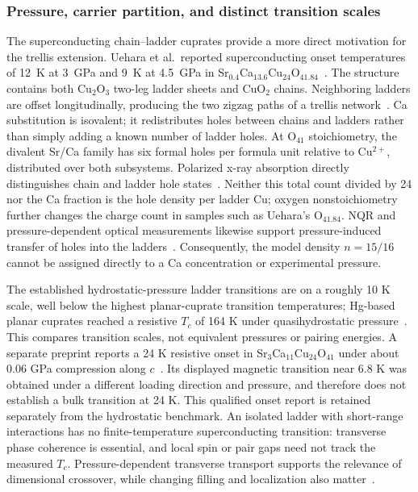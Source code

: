 \documentclass[11pt,letterpaper]{article}
\begin{document}
\subsubsection*{Pressure, carrier partition, and distinct transition scales}
The superconducting chain--ladder cuprates provide a more direct motivation
for the trellis extension. Uehara et al.\ reported superconducting onset
temperatures of 12~K at 3~GPa and 9~K at 4.5~GPa in
Sr$_{0.4}$Ca$_{13.6}$Cu$_{24}$O$_{41.84}$~\citep{Uehara1996}.
The structure contains both Cu$_2$O$_3$ two-leg ladder sheets and CuO$_2$
chains. Neighboring ladders are offset longitudinally, producing the two
zigzag paths of a trellis network~\citep{Popovic2000}.
Ca substitution is isovalent; it redistributes holes between chains and
ladders rather than simply adding a known number of ladder holes.
At O$_{41}$ stoichiometry, the divalent Sr/Ca family has six formal holes
per formula unit relative to Cu$^{2+}$, distributed over both subsystems.
Polarized x-ray absorption directly distinguishes chain and ladder
hole states~\citep{Nucker2000}. Neither this total count divided by 24 nor
the Ca fraction is the hole density per ladder Cu; oxygen nonstoichiometry
further changes the charge count in samples such as Uehara's O$_{41.84}$.
NQR and pressure-dependent optical measurements likewise support
pressure-induced transfer of holes into the ladders~\citep{Fujiwara2009,Frank2014}.
Consequently, the model density $n=15/16$ cannot be assigned directly to a
Ca concentration or experimental pressure.

The established hydrostatic-pressure ladder transitions are on a roughly
10 K scale, well below the highest planar-cuprate transition temperatures;
Hg-based planar cuprates reached a resistive $T_c$ of 164 K under
quasihydrostatic pressure~\citep{Gao1994}. This compares transition scales,
not equivalent pressures or pairing energies. A separate preprint reports a
24 K resistive onset in Sr$_3$Ca$_{11}$Cu$_{24}$O$_{41}$ under about
0.06 GPa compression along $c$~\citep{Radheep2013}. Its displayed magnetic
transition near 6.8 K was obtained under a different loading direction and
pressure, and therefore does not establish a bulk transition at 24 K.
This qualified onset report is retained separately from the hydrostatic
benchmark. An isolated ladder with short-range interactions has no
finite-temperature superconducting transition: transverse phase coherence
is essential, and local spin or pair gaps need not track the measured $T_c$.
Pressure-dependent transverse transport supports the relevance of dimensional
crossover, while changing filling and localization also matter~\citep{Nagata1998}.
\end{document}
